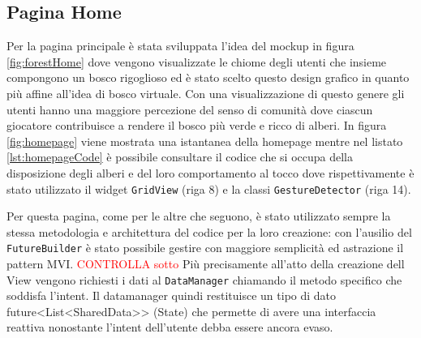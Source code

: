 \subsection{Pagina Home} 
Per la pagina principale è stata sviluppata l'idea del mockup in figura \ref{fig:forestHome} dove vengono visualizzate le chiome degli utenti che insieme compongono un bosco rigoglioso ed è stato scelto questo design grafico in quanto più affine all'idea di bosco virtuale. Con una visualizzazione di questo genere gli utenti hanno una maggiore percezione del senso di comunità dove ciascun giocatore contribuisce a rendere il bosco più verde e ricco di alberi. In figura \ref{fig:homepage} viene mostrata una istantanea della homepage mentre nel listato \ref{lst:homepageCode} è possibile consultare il codice che si occupa della disposizione degli alberi e del loro comportamento al tocco dove rispettivamente è stato utilizzato il widget \texttt{GridView} (riga 8) e la classi \texttt{GestureDetector} (riga 14).

Per questa pagina, come per le altre che seguono, è stato utilizzato sempre la stessa metodologia e architettura del codice per la loro creazione: con l'ausilio del \texttt{FutureBuilder} è stato possibile gestire con maggiore semplicità ed astrazione il pattern MVI. 
\textcolor{red}{CONTROLLA sotto}
Più precisamente all'atto della creazione dell View vengono richiesti i dati al \texttt{DataManager} chiamando il metodo specifico che soddisfa l'intent. Il datamanager quindi restituisce un tipo di dato future<List<SharedData>> (State) che permette di avere una interfaccia reattiva nonostante l'intent dell'utente debba essere ancora evaso.

